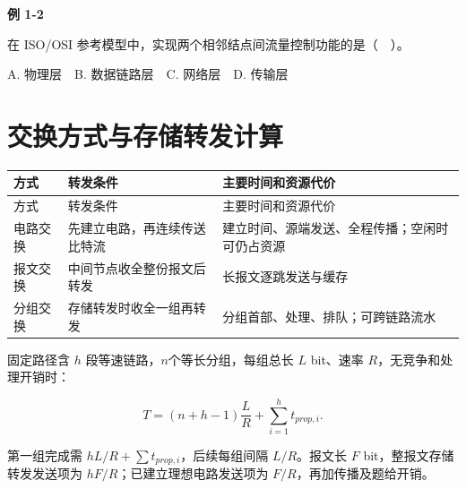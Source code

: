 \par\medskip{}\noindent\hypertarget{CN01-E02}{}\label{CN01-E02}\textbf{例 1-2}\par\nobreak\smallskip

在 ISO/OSI 参考模型中，实现两个相邻结点间流量控制功能的是（　）。

A. 物理层　B. 数据链路层　C. 网络层　D. 传输层

\section{交换方式与存储转发计算}\label{CN01-switching}

\par\smallskip
\begin{wideblock}
{\fontsize{9.3}{12}\selectfont\setlength{\tabcolsep}{2.5pt}\setlength{\LTleft}{0pt}\setlength{\LTright}{0pt}
\begin{longtable}{@{}>{\raggedright\arraybackslash}p{}>{\raggedright\arraybackslash}p{}>{\raggedright\arraybackslash}p{}@{}}
\toprule
方式 & 转发条件 & 主要时间和资源代价 \\

\midrule\endfirsthead\toprule
方式 & 转发条件 & 主要时间和资源代价 \\

\midrule\endhead\bottomrule\endfoot
电路交换 & 先建立电路，再连续传送比特流 & 建立时间、源端发送、全程传播；空闲时可仍占资源 \\

报文交换 & 中间节点收全整份报文后转发 & 长报文逐跳发送与缓存 \\

分组交换 & 存储转发时收全一组再转发 & 分组首部、处理、排队；可跨链路流水 \\

\end{longtable}}
\end{wideblock}
\par\smallskip

固定路径含 \(h\) 段等速链路，\(n\)个等长分组，每组总长 \(L\) bit、速率 \(R\)，无竞争和处理开销时：

\[T=(n+h-1)\frac LR+\sum_{i=1}^h t_{prop,i}.\]

第一组完成需 \(hL/R+\sum t_{prop,i}\)，后续每组间隔 \(L/R\)。报文长 \(F\) bit，整报文存储转发发送项为 \(hF/R\)；已建立理想电路发送项为 \(F/R\)，再加传播及题给开销。


